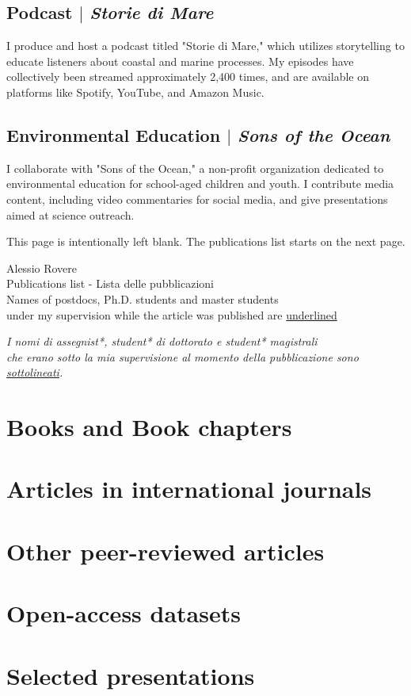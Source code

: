\documentclass[11pt]{article}
\begin{document}
\subsection{Podcast $|$ {\normalfont\textit{Storie di Mare}}}
{\footnotesize I produce and host a podcast titled "Storie di Mare," which utilizes storytelling to educate listeners about coastal and marine processes. My episodes have collectively been streamed approximately 2,400 times, and are available on platforms like Spotify, YouTube, and Amazon Music.}
\bigskip

\subsection{Environmental Education $|$ {\normalfont\textit{Sons of the Ocean}}}
{\footnotesize I collaborate with "Sons of the Ocean," a non-profit organization dedicated to environmental education for school-aged children and youth. I contribute media content, including video commentaries for social media, and give presentations aimed at science outreach.}
\bigskip

\newpage
This page is intentionally left blank. The publications list starts on the next page.
\newpage

\begin{center}
    {\fontsize{36}{36}\selectfont\interthin Alessio \interheavy Rovere} \\ \bigskip
    {\fontsize{14}{14}\selectfont\interthin Publications list - Lista delle pubblicazioni}\\ \bigskip
        {\color{icnclr}} {Names of postdocs, Ph.D. students and master students \\ under my supervision while the article was published are \underline{underlined}}
\bigskip

        {\color{icnclr}} \textit{{I nomi di assegnist*, student* di dottorato e student* magistrali \\ che erano sotto la mia supervisione al momento della pubblicazione sono \underline{sottolineati}.}}



\end{center}

\nocite{*}
\section{Books and Book chapters}
\printbibliography[type=book,heading=none]

\section{Articles in international journals}
\printbibliography[type=article,heading=none]

\section{Other peer-reviewed articles}
\printbibliography[type=periodical,heading=none]

\section{Open-access datasets}
\printbibliography[type=dataset,heading=none]

\section{Selected presentations}
\printbibliography[type=misc,heading=none]
\end{document}
